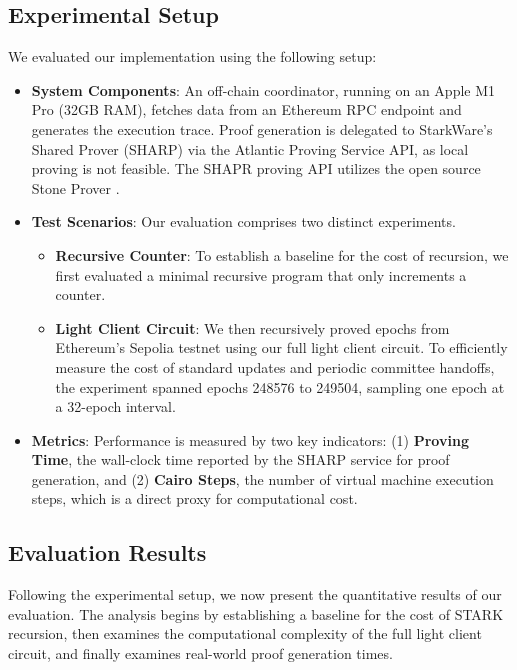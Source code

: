\documentclass[runningheads]{llncs}
\begin{document}
\subsection{Experimental Setup}
\label{subsection:experimental-setup}
We evaluated our implementation using the following setup:

\begin{itemize}
    \item \textbf{System Components}: An off-chain coordinator, running on an Apple M1 Pro (32GB RAM), fetches data from an Ethereum RPC endpoint and generates the execution trace. Proof generation is delegated to StarkWare's Shared Prover (SHARP) via the Atlantic Proving Service API, as local proving is not feasible. The SHAPR proving API utilizes the open source Stone Prover \cite{StarkWare2023Stone}.

    \item \textbf{Test Scenarios}: Our evaluation comprises two distinct experiments.
        \begin{itemize}
            \item \textbf{Recursive Counter}: To establish a baseline for the cost of recursion, we first evaluated a minimal recursive program that only increments a counter.
            \item \textbf{Light Client Circuit}: We then recursively proved epochs from Ethereum's Sepolia testnet using our full light client circuit. To efficiently measure the cost of standard updates and periodic committee handoffs, the experiment spanned epochs 248576 to 249504, sampling one epoch at a 32-epoch interval.
        \end{itemize}

    \item \textbf{Metrics}: Performance is measured by two key indicators: (1) \textbf{Proving Time}, the wall-clock time reported by the SHARP service for proof generation, and (2) \textbf{Cairo Steps}, the number of virtual machine execution steps, which is a direct proxy for computational cost.
\end{itemize}

\subsection{Evaluation Results}
\label{subsection:evaluation-results}
Following the experimental setup, we now present the quantitative results of our evaluation. The analysis begins by establishing a baseline for the cost of STARK recursion, then examines the computational complexity of the full light client circuit, and finally examines real-world proof generation times.
\end{document}
